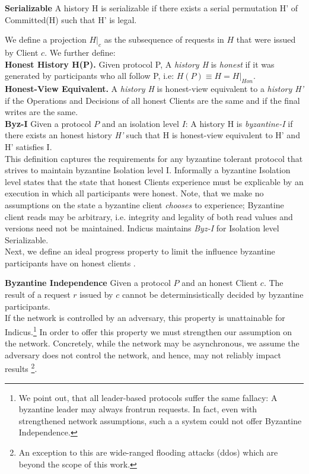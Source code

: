 \textbf{Serializable} 
A history H is serializable if there exists a serial permutation H' of Committed(H) such that H' is legal.

We define a projection $H|_c$ as the subsequence of requests in $H$ that were issued by Client $c$.
We further define:\\
\textbf{Honest History H(P).} Given protocol P, A \textit{history H} is \textit{honest} if it was generated by participants who all follow P, i.e: $H(P) \equiv H = H|_{Hon}$.\\
\textbf{Honest-View Equivalent.} A \textit{history H} is honest-view equivalent to a \textit{history H'} if the Operations and Decisions of all honest Clients are the same and if the final writes are the same.\\
\textbf{Byz-I} Given a protocol $P$ and an isolation level $I$:
A history H is \textit{byzantine-I} if there exists an honest history \textit{H'} such that H is honest-view equivalent to H' and H' satisfies I. \\

This definition captures the requirements for any byzantine tolerant protocol that strives to maintain byzantine Isolation level I.
Informally a byzantine Isolation level states that the state that honest Clients experience must be explicable by an execution in which all participants were honest. Note, that we make no assumptions on the state a byzantine client \textit{chooses} to experience; Byzantine client reads may be arbitrary, i.e. integrity and legality of both read values and versions need not be maintained. Indicus maintains \textit{Byz-I} for Isolation level Serializable.\\

Next, we define an ideal progress property to limit the influence byzantine participants have on honest clients . 

\textbf{Byzantine Independence}
Given a protocol $P$ and an honest Client $c$. The result of a request $r$ issued by $c$ cannot be determinsistically decided by byzantine participants.  \\

If the network is controlled by an adversary, this property is unattainable for Indicus.\footnote{We point out, that all leader-based protocols suffer the same fallacy: A byzantine leader may always frontrun requests. In fact, even with strengthened network assumptions, such a a system could not offer Byzantine Independence. } 
In order to offer this property we must strengthen our assumption on the network. Concretely, while the network may be asynchronous, we assume the adversary does not control the network, and hence, may not reliably impact results \footnote{An exception to this are wide-ranged flooding attacks (ddos) which are beyond the scope of this work.}. 




